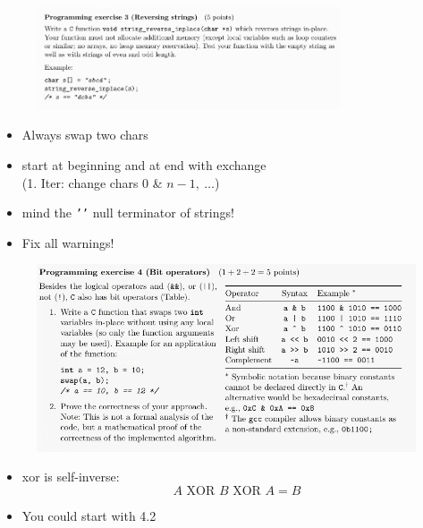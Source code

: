 \documentclass[10pt]{beamer}
\begin{document}
\begin{frame}{}
         \begin{figure}
          \includegraphics[keepaspectratio, width=0.8\textwidth, height=0.8\textheight-2\baselineskip-2\baselineskip]{img/102_ex4.png} \\
        \end{figure}
        \begin{itemize}
         \item Always swap two chars
         \item start at beginning and at end with exchange\\
         (1. Iter: change chars $0$ \& $n-1, \ \dots$)
         \item mind the \texttt{'\0'} null terminator of strings!
         \item Fix all warnings! \\
        \end{itemize}
        \framebreak 
        
         \begin{figure}
          \includegraphics[keepaspectratio, width=\textwidth, height=\textheight]{img/103_ex4.png} \\
        \end{figure}
        \begin{itemize}
         \item xor is self-inverse: 
         \[ A \text{ XOR } B \text{ XOR } A = B \]
         \item You could start with 4.2
        \end{itemize}
        \framebreak 
        

\end{frame}
\end{document}
